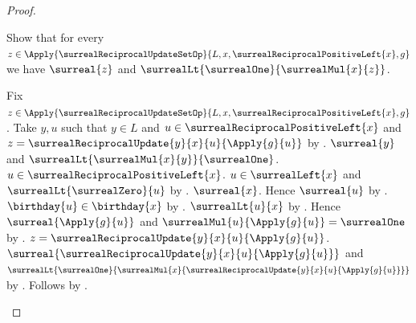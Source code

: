 \begin{proof}
\begin{subproof}
        Show that for every
            $z\in\Apply{\surrealReciprocalUpdateSetOp}{L,x,\surrealReciprocalPositiveLeft{x},g}$ we have
            $\surreal{z}$ and
                $\surrealLt{\surrealOne}{\surrealMul{x}{z}}$.
        \begin{subproof}
            Fix $z\in\Apply{\surrealReciprocalUpdateSetOp}{L,x,\surrealReciprocalPositiveLeft{x},g}$.
            Take $y,u$ such that $y\in L$ and
                $u\in\surrealReciprocalPositiveLeft{x}$ and
                $z=\surrealReciprocalUpdate{y}{x}{u}{\Apply{g}{u}}$
                by .
            $\surreal{y}$ and
                $\surrealLt{\surrealMul{x}{y}}{\surrealOne}$.
            $u\in\surrealReciprocalPositiveLeft{x}$.
            $u\in\surrealLeft{x}$ and
                $\surrealLt{\surrealZero}{u}$
                by .
            $\surreal{x}$.
            Hence $\surreal{u}$ by .
            $\birthday{u}\in\birthday{x}$
                by .
            $\surrealLt{u}{x}$ by .
            Hence $\surreal{\Apply{g}{u}}$ and
                $\surrealMul{u}{\Apply{g}{u}}=\surrealOne$
                by \auto.
            $z=\surrealReciprocalUpdate{y}{x}{u}{\Apply{g}{u}}$.
            $\surreal{\surrealReciprocalUpdate{y}{x}{u}{\Apply{g}{u}}}$
                and $\surrealLt{\surrealOne}{
                    \surrealMul{x}{\surrealReciprocalUpdate{y}{x}{u}{\Apply{g}{u}}}}$
                by
                .
            Follows by \auto.
        \end{subproof}


\end{subproof}
\end{proof}
